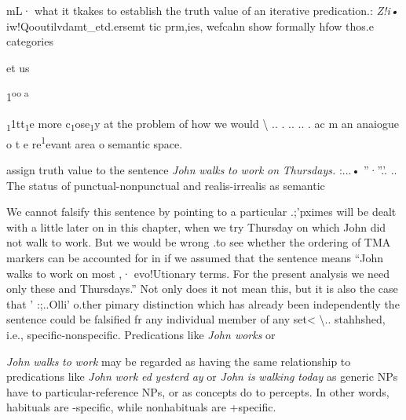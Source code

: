 mL· what it tkakes to establish the truth value of an iterative predication.: \textit{Z}\textit{!i•} iw!Qooutilvdamt\_etd.ersemt tic prm,ies, wefcahn show formally hfow thos.e categories

et us

1\textsuperscript{oo a}

\textsubscript{1}1tt\textsubscript{1}e more c\textsubscript{1}ose\textsubscript{1}y at the problem of how we would {\textbackslash} .. . .. .. . ac m an anaiogue o t e re\textsuperscript{1}evant area o semantic space.

assign truth value to the sentence \textit{John} \textit{wal}\textit{k}\textit{s} \textit{to} \textit{work} \textit{on} \textit{Thursdays. }:...• ''·''.'. .. The status of punctual-nonpunctual and realis-irrealis as semantic

We cannot falsify this sentence by pointing to a particular .;'pximes will be dealt with a little later on in this chapter, when we try Thursday on which John did not walk to work. But we would be wrong .to see whether the ordering of TMA markers can be accounted for in if we assumed that the sentence means ``John walks to work on most ,· evo!Utionary terms. For the present analysis we need only these and Thursdays.'' Not only does it not mean this, but it is also the case that ' :;..Olli' o.ther pimary distinction which has already been independently the sentence could be falsified fr any individual member of any set{\textless} {\textbackslash}.. stahhshed, i.e., specific-nonspecific. Predications like \textit{John works }or

  


 


\textit{John} \textit{walks} \textit{to} \textit{work }may be regarded as having the same relationship to predications like \textit{John} \textit{work} \textit{ed} \textit{yesterd} \textit{ay} or \textit{John} \textit{is} \textit{walking} \textit{today} as generic NPs have to particular-reference NPs, or as concepts do to percepts. In other words, habituals are {}-specific, while nonhabituals are +specific.


